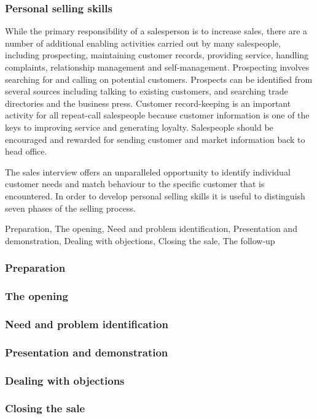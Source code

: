 \documentclass{article}
\begin{document}
\subsubsection{Personal selling skills}
While the primary responsibility of a salesperson is to increase sales, there are a number of additional enabling activities carried out by many salespeople, including prospecting, maintaining customer records, providing service, handling complaints, relationship management and self-management. Prospecting involves searching for and calling on potential customers. Prospects can be identified from several sources including talking to existing customers, and searching trade directories and the business press. Customer record-keeping is an important activity for all repeat-call salespeople because customer information is one of the keys to improving service and generating loyalty. Salespeople should be encouraged and rewarded for sending customer and market information back to head office. 

The sales interview offers an unparalleled opportunity to identify individual customer needs and match behaviour to the specific customer that is encountered. In order to develop personal selling skills it is useful to distinguish seven phases of the selling process. 

Preparation, The opening, Need and problem identification, Presentation and demonstration, Dealing with objections, Closing the sale, The follow-up

\subsubsection*{Preparation}
\subsubsection*{The opening}
\subsubsection*{Need and problem identification}
\subsubsection*{Presentation and demonstration}
\subsubsection*{Dealing with objections}
\subsubsection*{Closing the sale}
\end{document}
